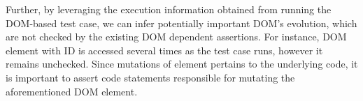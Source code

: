 Further, by leveraging the execution information obtained from running the DOM-based test case, we can infer potentially important DOM's evolution, which are not checked by the existing DOM dependent assertions. For instance, DOM element with ID  is accessed several times as the test case runs, however it remains unchecked. Since mutations of  element pertains to the underlying \javascript code, it is important to assert code statements responsible for mutating the aforementioned DOM element.             

%
%
 


